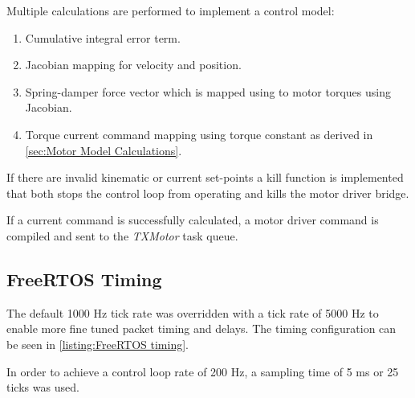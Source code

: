 Multiple calculations are performed to implement a control model:

\begin{enumerate}
\item Cumulative integral error term.
\item Jacobian mapping for velocity and position.
\item Spring-damper force vector which is mapped using to motor torques using Jacobian.
\item Torque current command mapping using torque constant as derived in \cref{sec:Motor Model Calculations}.
\end{enumerate}

If there are invalid kinematic or current set-points a kill function is implemented that both stops the control loop from operating and kills the motor driver bridge.

If a current command is successfully calculated, a motor driver command is compiled and sent to the \textit{TXMotor} task queue.

\subsection{FreeRTOS Timing}

The default 1000 Hz tick rate was overridden with a tick rate of 5000 Hz to enable more fine tuned packet timing and delays. The timing configuration can be seen in \cref{listing:FreeRTOS timing}. 

In order to achieve a control loop rate of 200 Hz, a sampling time of 5 ms or 25 ticks was used.

